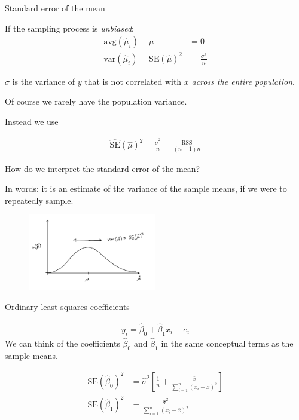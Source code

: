\documentclass[aspectratio=169]{beamer}
\begin{document}
\begin{frame}{Standard error of the mean}

If the sampling process is \textit{unbiased}:
\begin{align*}
\text{avg}(\hat{\mu}_i) - \mu &= 0\\
\text{var}(\hat{\mu}_i) = \text{SE}(\hat{\mu})^2 &= \frac{\sigma^2}{n}
\end{align*}

$\sigma$ is the variance of $y$ that is not correlated with $x$ \textit{across the entire population}.

\vspace{5mm}

Of course we rarely have the population variance.  

\vspace{5mm}

Instead we use

\begin{align*}
\hat{\text{SE}}(\hat{\mu})^2 = \frac{\hat{\sigma}^2}{n} = \frac{\text{RSS}}{(n-1)n}
\end{align*}

\end{frame}

\begin{frame}{How do we interpret the standard error of the mean?}

In words: it is an estimate of the variance of the sample means, if we were to repeatedly sample.

\pause
\begin{figure}
\includegraphics[width=0.5\textwidth]{sample_mean_dist}
\end{figure}
\end{frame}


\begin{frame}{Ordinary least squares coefficients}

\begin{align*}
y_i=\hat{\beta}_0+\hat{\beta}_1x_i+e_i
\end{align*}
We can think of the coefficients $\hat{\beta}_0$ and $\hat{\beta}_1$ in the same conceptual terms as the sample means.

\begin{align*}
\text{SE}(\hat{\beta}_0)^2 &= \hat{\sigma}^2 \left[ \frac{1}{n} +
\frac{\bar{x}}{\sum_{i=1}^n (x_i-\bar{x})^2} \right]\\
\text{SE}(\hat{\beta}_1)^2& = \frac{\hat{\sigma}^2}{\sum_{i=1}^n (x_i-\bar{x})^2}
\end{align*}

\end{frame}
\end{document}

